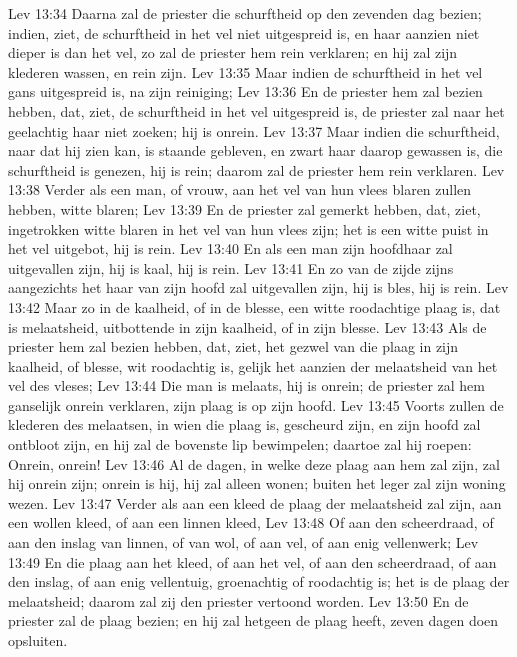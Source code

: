 Lev 13:34  Daarna zal de priester die schurftheid op den zevenden dag bezien; indien, ziet, de schurftheid in het vel niet uitgespreid is, en haar aanzien niet dieper is dan het vel, zo zal de priester hem rein verklaren; en hij zal zijn klederen wassen, en rein zijn.
Lev 13:35  Maar indien de schurftheid in het vel gans uitgespreid is, na zijn reiniging;
Lev 13:36  En de priester hem zal bezien hebben, dat, ziet, de schurftheid in het vel uitgespreid is, de priester zal naar het geelachtig haar niet zoeken; hij is onrein.
Lev 13:37  Maar indien die schurftheid, naar dat hij zien kan, is staande gebleven, en zwart haar daarop gewassen is, die schurftheid is genezen, hij is rein; daarom zal de priester hem rein verklaren.
Lev 13:38  Verder als een man, of vrouw, aan het vel van hun vlees blaren zullen hebben, witte blaren;
Lev 13:39  En de priester zal gemerkt hebben, dat, ziet, ingetrokken witte blaren in het vel van hun vlees zijn; het is een witte puist in het vel uitgebot, hij is rein.
Lev 13:40  En als een man zijn hoofdhaar zal uitgevallen zijn, hij is kaal, hij is rein.
Lev 13:41  En zo van de zijde zijns aangezichts het haar van zijn hoofd zal uitgevallen zijn, hij is bles, hij is rein.
Lev 13:42  Maar zo in de kaalheid, of in de blesse, een witte roodachtige plaag is, dat is melaatsheid, uitbottende in zijn kaalheid, of in zijn blesse.
Lev 13:43  Als de priester hem zal bezien hebben, dat, ziet, het gezwel van die plaag in zijn kaalheid, of blesse, wit roodachtig is, gelijk het aanzien der melaatsheid van het vel des vleses;
Lev 13:44  Die man is melaats, hij is onrein; de priester zal hem ganselijk onrein verklaren, zijn plaag is op zijn hoofd.
Lev 13:45  Voorts zullen de klederen des melaatsen, in wien die plaag is, gescheurd zijn, en zijn hoofd zal ontbloot zijn, en hij zal de bovenste lip bewimpelen; daartoe zal hij roepen: Onrein, onrein!
Lev 13:46  Al de dagen, in welke deze plaag aan hem zal zijn, zal hij onrein zijn; onrein is hij, hij zal alleen wonen; buiten het leger zal zijn woning wezen.
Lev 13:47  Verder als aan een kleed de plaag der melaatsheid zal zijn, aan een wollen kleed, of aan een linnen kleed,
Lev 13:48  Of aan den scheerdraad, of aan den inslag van linnen, of van wol, of aan vel, of aan enig vellenwerk;
Lev 13:49  En die plaag aan het kleed, of aan het vel, of aan den scheerdraad, of aan den inslag, of aan enig vellentuig, groenachtig of roodachtig is; het is de plaag der melaatsheid; daarom zal zij den priester vertoond worden.
Lev 13:50  En de priester zal de plaag bezien; en hij zal hetgeen de plaag heeft, zeven dagen doen opsluiten.

